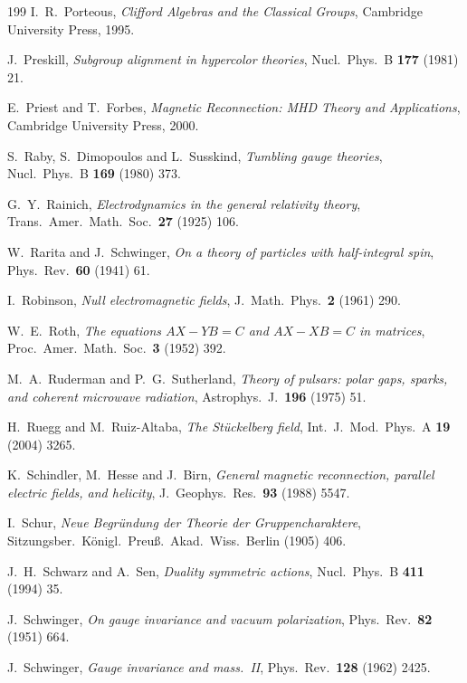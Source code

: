 \begin{thebibliography}{199}
 I.~R.~Porteous, \emph{Clifford Algebras and the Classical Groups}, Cambridge University Press, 1995.

 J.~Preskill, \emph{Subgroup alignment in hypercolor theories}, Nucl.~Phys.~B \textbf{177} (1981) 21.

 E.~Priest and T.~Forbes, \emph{Magnetic Reconnection: MHD Theory and Applications}, Cambridge University Press, 2000.

 S.~Raby, S.~Dimopoulos and L.~Susskind, \emph{Tumbling gauge theories}, Nucl.~Phys.~B \textbf{169} (1980) 373.

 G.~Y.~Rainich, \emph{Electrodynamics in the general relativity theory}, Trans.~Amer.~Math.~Soc.~\textbf{27} (1925) 106.

 W.~Rarita and J.~Schwinger, \emph{On a theory of particles with half-integral spin}, Phys.~Rev.~\textbf{60} (1941) 61.

 I.~Robinson, \emph{Null electromagnetic fields}, J.~Math.~Phys.~\textbf{2} (1961) 290.

 W.~E.~Roth, \emph{The equations $AX-YB=C$ and $AX-XB=C$ in matrices}, Proc.~Amer.~Math.~Soc.~\textbf{3} (1952) 392.

 M.~A.~Ruderman and P.~G.~Sutherland, \emph{Theory of pulsars: polar gaps, sparks, and coherent microwave radiation}, Astrophys.~J.~\textbf{196}
(1975) 51.

 H.~Ruegg and M.~Ruiz-Altaba, \emph{The St\"uckelberg field}, Int.~J.~Mod.~Phys.~A \textbf{19} (2004) 3265.

 K.~Schindler, M.~Hesse and J.~Birn, \emph{General magnetic reconnection, parallel electric fields, and helicity}, J.~Geophys.~Res.~\textbf{93}
(1988) 5547.

 I.~Schur, \emph{Neue Begr\"undung der Theorie der Gruppencharaktere}, Sitzungsber.~K\"onigl.~Preu\ss.~Akad.~Wiss.~Berlin (1905) 406.

 J.~H.~Schwarz and A.~Sen, \emph{Duality symmetric actions}, Nucl.~Phys.~B \textbf{411} (1994) 35.

 J.~Schwinger, \emph{On gauge invariance and vacuum polarization}, Phys.~Rev.~\textbf{82} (1951) 664.

 J.~Schwinger, \emph{Gauge invariance and mass.~II}, Phys.~Rev.~\textbf{128} (1962) 2425.


\end{thebibliography}

